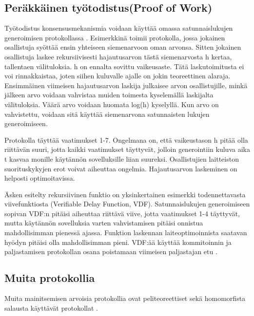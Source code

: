 \documentclass{article}
\begin{document}
\subsection{Peräkkäinen työtodistus(Proof of Work)}
Työtodistus konsensusmekanismia voidaan käyttää omassa satunnaislukujen generoimisen protokollassa \cite{lesaege_kleros_2020}. Esimerkkinä toimii protokolla, jossa jokainen osallistuja syöttää ensin yhteiseen siemenarvoon oman arvonsa. Sitten jokainen osallistuja laskee rekursiivisesti hajautusarvon tästä siemenarvosta h kertaa, tallentaen välituloksia. h on ennalta sovittu vaikeusaste. Tätä laskutoimitusta ei voi rinnakkaistaa, joten siihen kuluvalle ajalle on jokin teoreettinen alaraja. Ensimmäinen viimeisen hajautusarvon laskija julkaisee arvon osallistujille, minkä jälkeen arvo voidaan vahvistaa muiden toimesta kyselemällä laskijalta välituloksia. Väärä arvo voidaan huomata log(h) kyselyllä. Kun arvo on vahvistettu, voidaan sitä käyttää siemenarvona satunnaisten lukujen generoimiseen. 

Protokolla täyttää vaatimukset 1-7. Ongelmana on, että vaikeustason h pitää olla riittävän suuri, jotta kaikki vaatimukset täyttyvät, jolloin generointiin kuluva aika t kasvaa monille käytännön sovelluksille liian suureksi. Osallistujien laitteiston suorituskykyjen erot voivat aiheuttaa ongelmia. Hajautusarvon laskeminen on helposti optimoitavissa.

Äsken esitelty rekursiivinen funktio on yksinkertainen esimerkki todennettavasta viivefunktiosta (Verifiable Delay Function, VDF). Satunnaislukujen generoimiseen sopivan VDF:n pitäisi aiheuttaa riittävä viive, jotta vaatimukset 1-4 täyttyvät, mutta käytännön sovelluksia varten vahvistamisen pitäisi onnistua mahdollisimman pienessä ajassa. Funktion laskennan laiteoptimoinnista saatavan hyödyn pitäisi olla mahdollisimman pieni. VDF:ää käyttää kommitoinnin ja paljastamisen protokollan osana poistamaan viimeisen paljastajan etu \cite{boneh_verifiable_2018}.

\subsection{Muita protokollia}
Muita mainitsemisen arvoisia protokollia ovat peliteoreettiset sekä homomorfista salausta käyttävät protokollat \cite{simic_review_2020}.



\end{document}

